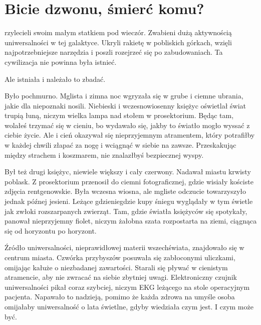 \chapter{Bicie dzwonu, śmierć komu?}



rzylecieli swoim małym statkiem pod wieczór.
Zwabieni dużą aktywnością uniwersalności w tej galaktyce.
Ukryli rakietę w pobliskich górkach, wzięli najpotrzebniejsze narzędzia i poszli rozejrzeć się po zabudowaniach.
Ta cywilizacja nie powinna była istnieć.

Ale istniała i należało to zbadać.

Było pochmurno.
Mglista i zimna noc wgryzała się w grube i ciemne ubrania, jakie dla niepoznaki nosili.
Niebieski i wczesnowiosenny księżyc oświetlał świat trupią łuną, niczym wielka lampa nad stołem w prosektorium.
Będąc tam, wolałeś trzymać się w cieniu, bo wydawało się, jakby to światło mogło wyssać z ciebie życie.
Ale i cień okazywał się nieprzyjemnym atramentem, który potrafiłby w każdej chwili złapać za nogę i wciągnąć w siebie na zawsze. 
Przeskakując między strachem i koszmarem, nie znalazłbyś bezpiecznej wyspy.

Był też drugi księżyc, niewiele większy i cały czerwony.
Nadawał miastu krwisty poblask. 
Z prosektorium przenosił do ciemni fotograficznej, gdzie wisiały kościste zdjęcia rentgenowskie.
Była wczesna wiosna, ale mgliste odczucie towarzyszyło jednak późnej jesieni.
Leżące gdzieniegdzie kupy śniegu wyglądały w tym świetle jak zwłoki rozszarpanych zwierząt.
Tam, gdzie światła księżyców się spotykały, panował nieprzyjemny fiolet, niczym żałobna szata rozpostarta na ziemi, ciągnąca się od horyzontu po horyzont.

Źródło uniwersalności, nieprawidłowej materii wszechświata, znajdowało się w centrum miasta.
Czwórka przybyszów posuwała się zabłoconymi uliczkami, omijając kałuże o niezbadanej zawartości.
Starali się pływać w cienistym atramencie, aby nie zwracać na siebie zbytniej uwagi.
Elektroniczny czujnik uniwersalności pikał coraz szybciej, niczym EKG leżącego na stole operacyjnym pacjenta.
Napawało to nadzieją, pomimo że każda zdrowa na umyśle osoba omijałaby uniwersalność o lata świetlne, gdyby wiedziała czym jest. I czym może być.

